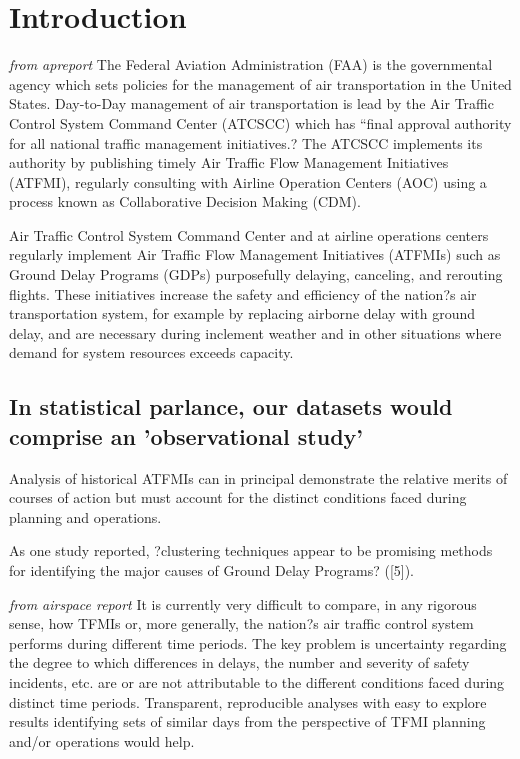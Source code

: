 \section{Introduction}

\emph{from apreport}
The Federal Aviation Administration (FAA) is the governmental agency which sets policies for the management of air transportation in the United States.  Day-to-Day management of air transportation is lead by the Air Traffic Control System Command Center (ATCSCC) which has ``final approval authority for all national traffic management initiatives.?  The ATCSCC implements its authority by publishing timely Air Traffic Flow Management Initiatives (ATFMI), regularly consulting with Airline Operation Centers (AOC) using a process known as Collaborative Decision Making (CDM).   


Air Traffic Control System Command Center and at airline operations centers regularly implement Air Traffic Flow Management Initiatives (ATFMIs) such as Ground Delay Programs (GDPs) purposefully delaying, canceling, and rerouting flights. These initiatives increase the safety and efficiency of the nation?s air transportation system, for example by replacing airborne delay with ground delay, and are necessary during inclement weather and in other situations where demand for system resources exceeds capacity.

\subsection{In statistical parlance, our datasets would comprise an 'observational study'}

Analysis of historical ATFMIs can in principal demonstrate the relative merits of courses of action but must account for the distinct conditions faced during planning and operations.

As one study reported, ?clustering techniques appear to be promising methods for identifying the major causes of Ground Delay Programs? ([5]).

\emph{from airspace report}
It is currently very difficult to compare, in any rigorous sense, how TFMIs or, more generally, the nation?s air traffic control system performs during different time periods. The key problem is uncertainty regarding the degree to which differences in delays, the number and severity of safety incidents, etc. are or are not attributable to the different conditions faced during distinct time periods. Transparent, reproducible analyses with easy to explore results identifying sets of similar days from the perspective of TFMI planning and/or operations would help.

